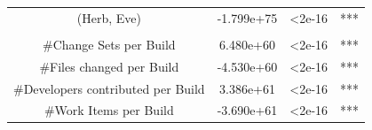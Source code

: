 \documentclass[12pt,oneside]{book}
\begin{document}
\begin{table}[t]
\begin{tabular}{cccc}
(Herb, Eve)  	&   -1.799e+75     & <2e-16 &***\\
\\
\#Change Sets per Build     & \phantom{-}6.480e+60 &   <2e-16 &***\\
\#Files changed per Build            &-4.530e+60 &  <2e-16 &***\\
{\small \#Developers contributed per Build}  &   \phantom{-}3.386e+61 &  <2e-16 &***\\
\#Work Items per Build    &  -3.690e+61   & <2e-16 &***\\
%
%
%

\end{tabular}
\end{table}
\end{document}
